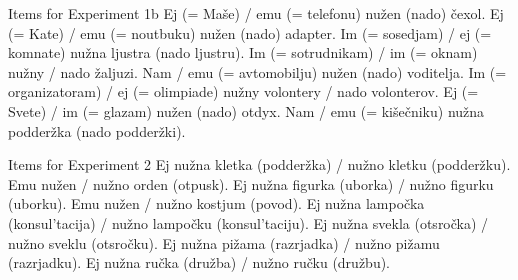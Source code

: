 \documentclass[output=paper]{langscibook}
\begin{document}
\ea Items for Experiment 1b
\ea Ej (= Maše) / emu (= telefonu) nužen (nado) čexol.
\ex Ej (= Kate) / emu (= noutbuku) nužen (nado) adapter.
\ex  Im (= sosedjam) / ej (= komnate) nužna ljustra (nado ljustru).
\ex  Im (= sotrudnikam) / im (= oknam) nužny / nado žaljuzi.
\ex  Nam / emu (= avtomobilju) nužen (nado) voditelja.
\ex  Im (= organizatoram) / ej (= olimpiade) nužny volontery / nado volonterov.
\ex  Ej (= Svete) / im (= glazam) nužen (nado) otdyx.
\ex  Nam / emu (= kišečniku) nužna podderžka (nado podderžki).
\z \z

\ea Items for Experiment 2
\ea Ej nužna kletka (podderžka) / nužno  kletku (podderžku).
\ex Emu nužen / nužno  orden (otpusk).
\ex Ej nužna figurka (uborka) / nužno  figurku (uborku).
\ex Emu nužen / nužno  kostjum (povod).
\ex Ej nužna lampočka (konsul'tacija) / nužno  lampočku (konsul'taciju).
\ex Ej nužna svekla (otsročka) / nužno  sveklu (otsročku).
\ex Ej nužna pižama (razrjadka) / nužno  pižamu (razrjadku).
\ex Ej nužna ručka (družba) / nužno  ručku (družbu).
\z \z
\end{document}
